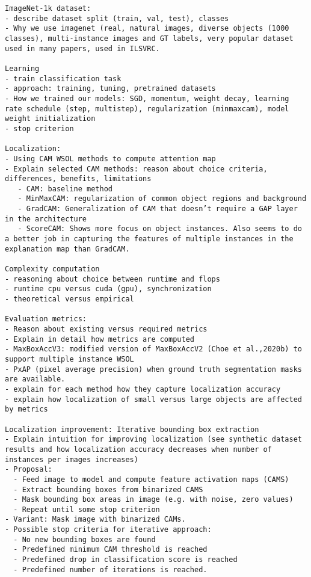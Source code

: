 \begin{verbatim}
ImageNet-1k dataset:
- describe dataset split (train, val, test), classes
- Why we use imagenet (real, natural images, diverse objects (1000 classes), multi-instance images and GT labels, very popular dataset used in many papers, used in ILSVRC.

Learning
- train classification task
- approach: training, tuning, pretrained datasets
- How we trained our models: SGD, momentum, weight decay, learning rate schedule (step, multistep), regularization (minmaxcam), model weight initialization
- stop criterion

Localization:
- Using CAM WSOL methods to compute attention map
- Explain selected CAM methods: reason about choice criteria, differences, benefits, limitations
   - CAM: baseline method
   - MinMaxCAM: regularization of common object regions and background
   - GradCAM: Generalization of CAM that doesn’t require a GAP layer in the architecture
   - ScoreCAM: Shows more focus on object instances. Also seems to do a better job in capturing the features of multiple instances in the explanation map than GradCAM.

Complexity computation
- reasoning about choice between runtime and flops
- runtime cpu versus cuda (gpu), synchronization
- theoretical versus empirical

Evaluation metrics:
- Reason about existing versus required metrics
- Explain in detail how metrics are computed
- MaxBoxAccV3: modified version of MaxBoxAccV2 (Choe et al.,2020b) to support multiple instance WSOL
- PxAP (pixel average precision) when ground truth segmentation masks are available.
- explain for each method how they capture localization accuracy
- explain how localization of small versus large objects are affected by metrics

Localization improvement: Iterative bounding box extraction
- Explain intuition for improving localization (see synthetic dataset results and how localization accuracy decreases when number of instances per images increases)
- Proposal:
  - Feed image to model and compute feature activation maps (CAMS)
  - Extract bounding boxes from binarized CAMS
  - Mask bounding box areas in image (e.g. with noise, zero values) 
  - Repeat until some stop criterion
- Variant: Mask image with binarized CAMs.
- Possible stop criteria for iterative approach:
  - No new bounding boxes are found
  - Predefined minimum CAM threshold is reached
  - Predefined drop in classification score is reached
  - Predefined number of iterations is reached.
\end{verbatim}

